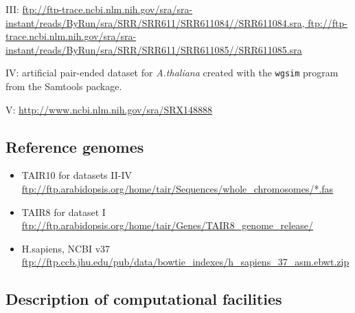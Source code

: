 \documentclass[11pt, oneside]{article}   	%
\begin{document}
III: \url{ftp://ftp-trace.ncbi.nlm.nih.gov/sra/sra-instant/reads/ByRun/sra/SRR/SRR611/SRR611084//SRR611084.sra, ftp://ftp-trace.ncbi.nlm.nih.gov/sra/sra-instant/reads/ByRun/sra/SRR/SRR611/SRR611085//SRR611085.sra}

IV: artificial pair-ended dataset for {\it A.thaliana} created with the {\tt wgsim} program from the Samtools package.

V: \url{http://www.ncbi.nlm.nih.gov/sra/SRX148888}


\subsection{Reference genomes}
\begin{itemize}
\item TAIR10 for datasets II-IV \url{ftp://ftp.arabidopsis.org/home/tair/Sequences/whole\_chromosomes/*.fas}
\item TAIR8 for dataset I \url{ftp://ftp.arabidopsis.org/home/tair/Genes/TAIR8\_genome\_release/}
\item H.sapiens, NCBI v37 \url{ftp://ftp.ccb.jhu.edu/pub/data/bowtie\_indexes/h\_sapiens\_37\_asm.ebwt.zip}
\end{itemize}

\subsection{Description of computational facilities}
\end{document}
